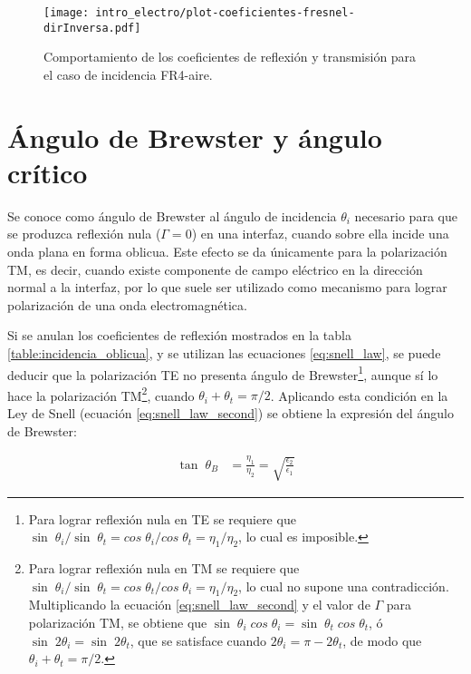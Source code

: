 \begin{figure}[htp]
	\centering
	\texttt{[image: intro\_electro/plot-coeficientes-fresnel-dirInversa.pdf]}
	\caption{Comportamiento de los coeficientes de reflexión y transmisión para el caso de incidencia FR4-aire.}
	\label{fig:coeficientes-fr4-aire}
\end{figure}



\section{Ángulo de Brewster y ángulo crítico}

Se conoce como ángulo de Brewster al ángulo de incidencia $\theta_i$ necesario para que se produzca reflexión nula ($\Gamma = 0$) en una interfaz, cuando sobre ella incide una onda plana en forma oblicua. Este efecto se da únicamente para la polarización TM, es decir, cuando existe componente de campo eléctrico en la dirección normal a la interfaz, por lo que suele ser utilizado como mecanismo para lograr polarización de una onda electromagnética.

Si se anulan los coeficientes de reflexión mostrados en la tabla \ref{table:incidencia_oblicua}, y se utilizan las ecuaciones \ref{eq:snell_law}, se puede deducir que la polarización TE no presenta ángulo de Brewster\footnote{Para lograr reflexión nula en TE se requiere que $\sin \; \theta_i / \sin \; \theta_t = cos \; \theta_i / cos \; \theta_t = \eta_1 / \eta_2$, lo cual es imposible.}, aunque sí lo hace la polarización TM\footnote{Para lograr reflexión nula en TM se requiere que $\sin \; \theta_i / \sin \; \theta_t = cos \; \theta_t / cos \; \theta_i = \eta_1 / \eta_2$, lo cual no supone una contradicción. Multiplicando la ecuación \ref{eq:snell_law_second} y el valor de $\Gamma$ para polarización TM, se obtiene que $\sin\;\theta_i \; cos \; \theta_i = \sin \; \theta_t \; cos \; \theta_t$, ó $\sin \; 2\theta_i = \sin \; 2\theta_t$, que se satisface cuando $2\theta_i = \pi - 2\theta_t$, de modo que $\theta_i + \theta_t = \pi/2$.}, cuando $\theta_i + \theta_t = \pi/2$. Aplicando esta condición en la Ley de Snell (ecuación \ref{eq:snell_law_second}) se obtiene la expresión del ángulo de Brewster:


\begin{align}
	\label{eq:Brewster_angle}
	\tan\;\theta_B &= \frac{\eta_1}{\eta_2} = \sqrt{\frac{\epsilon_2}{\epsilon_1}}
\end{align}

